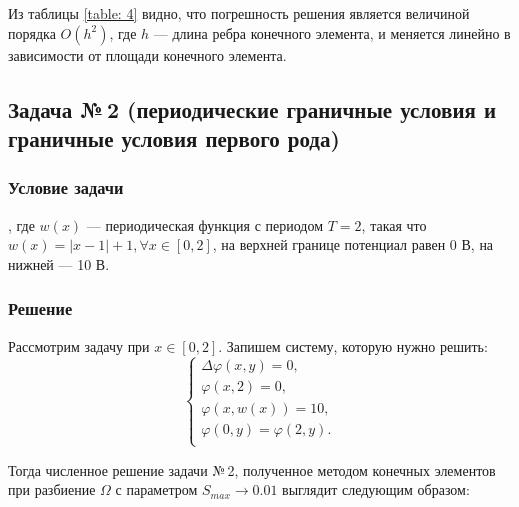 \documentclass[12pt, a4paper]{article}
\renewcommand{\phi}{\varphi}
\begin{document}
		Из таблицы \ref{table: 4} видно, что погрешность решения является величиной порядка $O(h^2)$, где $h$ --- длина ребра конечного элемента, и меняется линейно в зависимости от площади конечного элемента.
			
	\newpage
	\subsection{Задача №\,2 (периодические граничные условия и граничные условия первого рода)}
		\subsubsection{Условие задачи}
			, где $w(x)$ --- периодическая функция с периодом $T = 2$, такая что $w(x) = |x - 1| + 1, \forall x \in \left[ 0, 2 \right]$, на верхней границе потенциал равен 0 В, на нижней --- 10 В.
		\subsubsection{Решение}
			Рассмотрим задачу при $x \in \left[ 0, 2 \right]$. Запишем систему, которую нужно решить:
			\begin{equation*}
				\begin{cases}
					\Delta \phi (x, y)  = 0, \\
					\phi (x, 2) = 0, \\
					\phi (x, w(x)) = 10, \\
					\phi (0, y) = \phi (2, y).\\
				\end{cases}
			\end{equation*}
			
			Тогда численное решение задачи №\,2, полученное методом конечных элементов при разбиение $\Omega$ с параметром $S_{max} \rightarrow 0.01$ выглядит следующим образом: 

			
\end{document}
